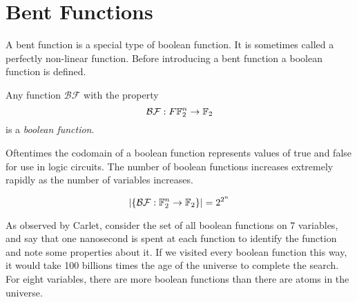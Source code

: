 \section{Bent Functions}
\par A bent function is a special type of boolean function. It is sometimes
called a perfectly non-linear function. Before introducing a bent function
a boolean function is defined.

\begin{definition}
\label{def:boolean-function}
  Any function $\mathcal{BF}$ with the property
  \begin{equation}
    \mathcal{BF}:F\mathbb{F}_2^n\rightarrow\mathbb{F}_2
  \end{equation}
  is a {\em boolean function}.
\end{definition}

\par Oftentimes the codomain of a boolean function represents values of true
and false for use in logic circuits. The number of boolean functions increases
extremely rapidly as the number of variables increases.

\begin{equation}
  \lvert\{\mathcal{BF}:\mathbb{F}_2^n\rightarrow\mathbb{F}_2\}\rvert = 2^{2^n}
\end{equation}

\par As observed by Carlet, consider the set of all boolean functions on 7 variables,
and say that one nanosecond is spent at each function to identify the function and
note some properties about it. If we visited every boolean function this way, it
would take 100 billions times the age of the universe to complete the search.
For eight variables, there are more boolean functions than there are atoms in the
universe.

